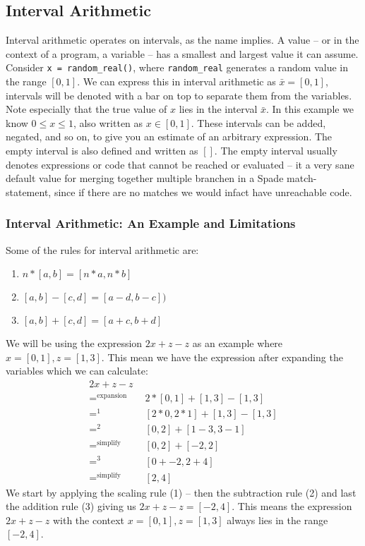 \subsection{Interval Arithmetic}
Interval arithmetic operates on intervals, as the name implies. A value -- or in the context of a program, a variable -- has a smallest and largest value it can assume. Consider \verb`x = random_real()`, where \verb`random_real` generates a random value in the range $[0, 1]$. We can express this in interval arithmetic as $\bar{x} = [0, 1]$, intervals will be denoted with a bar on top to separate them from the variables. Note especially that the true value of $x$ lies in the interval $\bar{x}$. In this example we know $0 \leq x \leq 1$, also written as $x \in [0, 1]$. These intervals can be added, negated, and so on, to give you an estimate of an arbitrary expression. The empty interval is also defined and written as $[]$. The empty interval usually denotes expressions or code that cannot be reached or evaluated -- it a very sane default value for merging together multiple branchen in a Spade match-statement, since if there are no matches we would infact have unreachable code.

\subsubsection{Interval Arithmetic: An Example and Limitations}
Some of the rules for interval arithmetic are:
\begin{enumerate}
  \item $n * [a, b] = [n * a, n * b]$
  \item $[a, b] - [c, d] = [a - d, b - c])$
  \item $[a, b] + [c, d] = [a + c, b + d]$
\end{enumerate}

We will be using the expression $2x + z - z$ as an example where $x = [0, 1], z = [1, 3]$. This mean we have the expression after expanding the variables which we can calculate:
\begin{align*}
  2x + z - z \\
  =^{\text{expansion}} \quad & 2 * [0, 1] + [1, 3] - [1, 3] \\
  =^{1}                \quad & [2 * 0, 2 * 1] + [1, 3] - [1, 3] \\
  =^{2}                \quad & [0, 2] + [1 - 3, 3 - 1] \\
  =^{\text{simplify}}  \quad & [0, 2] + [-2, 2] \\
  =^{3}                \quad & [0 + -2, 2 + 4] \\
  =^{\text{simplify}}  \quad & [2, 4]
\end{align*}
We start by applying the scaling rule (1) -- then the subtraction rule (2) and last the addition rule (3) giving us $2x + z - z = [-2, 4]$. This means the expression $2x + z - z$ with the context $x = [0, 1], z = [1, 3]$ always lies in the range $[-2, 4]$.
\label{sec:prevResultIA}

